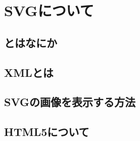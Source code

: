 \chapter{SVGについて}
\section{とはなにか}

\section{{XML}とは}

\section{SVGの画像を表示する方法}

\section{HTML5について}



